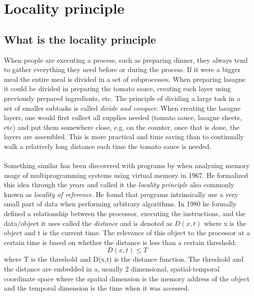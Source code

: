 \documentclass[pdftex,a4paper,12pt,twoside]{report}
\begin{document}
\section{Locality principle}
\subsection{What is the locality principle}
When people are executing a process, such as preparing dinner, they always tend to gather everything they need before or during the process. If it were a bigger meal the entire meal is divided in a set of subprocesses. When preparing lasagne it could be divided in preparing the tomato sauce, creating each layer using previously prepared ingredients, etc. The principle of dividing a large task in a set of smaller subtasks is called \emph{divide and conquer}. %
When creating the lasagne layers, one would first collect all supplies needed (tomato sauce, lasagne sheets, etc) and put them somewhere close, e.g. on the counter, once that is done, the layers are assembled. This is more practical and time saving than to continually walk a relatively long distance each time the tomato sauce is needed.
\\\\
Something similar has been discovered with programs by \cite{locality_principle} when analyzing memory usage of multiprogramming systems using virtual memory in 1967.
He formalized this idea through the years and called it the \emph{locality principle} also commonly known as \emph{locality of reference}. He found that programs intrinsically use a very small part of data when performing arbitrary algorithms. In 1980 he formally defined a relationship between the processor, executing the instructions, and the data/object it uses called the \emph{distance} and is denoted as $D(x,t)$ where x is the object and t is the current time. The relevance of this object to the processor at a certain time is based on whether the distance is less than a certain threshold:
\[
	D(x,t) \leq T
\]
where T is the threshold and D(x,t) is the distance function. The threshold and the distance are embedded in a, usually 2 dimensional, spatial-temporal coordinate space where the spatial dimension is the memory address of the object and the temporal dimension is the time when it was accessed.
\end{document}
